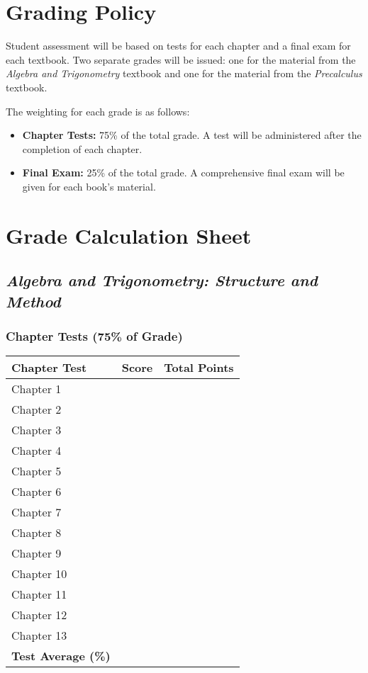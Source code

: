 \documentclass[11pt, letterpaper]{article}
\begin{document}
\section*{Grading Policy}
Student assessment will be based on tests for each chapter and a final exam for each textbook. Two separate grades will be issued: one for the material from the \textit{Algebra and Trigonometry} textbook and one for the material from the \textit{Precalculus} textbook.

The weighting for each grade is as follows:
\begin{itemize}
    \item \textbf{Chapter Tests:} 75\% of the total grade. A test will be administered after the completion of each chapter.
    \item \textbf{Final Exam:} 25\% of the total grade. A comprehensive final exam will be given for each book's material.
\end{itemize}

\newpage
\section*{Grade Calculation Sheet}

\subsection*{\textit{Algebra and Trigonometry: Structure and Method}}
\subsubsection*{Chapter Tests (75\% of Grade)}
\begin{tabular}{|p{6cm}|p{3cm}|p{3cm}|}
\hline
\textbf{Chapter Test} & \textbf{Score} & \textbf{Total Points} \\
\hline
Chapter 1 & & \\ \hline
Chapter 2 & & \\ \hline
Chapter 3 & & \\ \hline
Chapter 4 & & \\ \hline
Chapter 5 & & \\ \hline
Chapter 6 & & \\ \hline
Chapter 7 & & \\ \hline
Chapter 8 & & \\ \hline
Chapter 9 & & \\ \hline
Chapter 10 & & \\ \hline
Chapter 11 & & \\ \hline
Chapter 12 & & \\ \hline
Chapter 13 & & \\ \hline
\textbf{Test Average (\%)} & & \\
\hline
\end{tabular}
\end{document}
